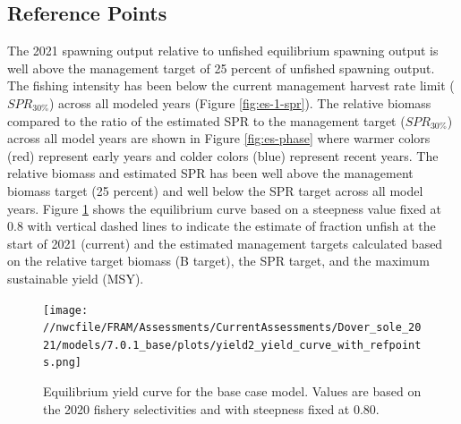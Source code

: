\documentclass[11pt,
  english,
  a4paper,
]{article}
\begin{document}
\hypertarget{reference-points}{%
\subsection*{Reference Points}\label{reference-points}}

\leavevmode\tagmcend\tagstructend


The 2021 spawning output relative to unfished equilibrium spawning output is well above the management target of 25 percent of unfished spawning output. The fishing intensity has been below the current management harvest rate limit ({\(SPR_{30\%}\)\leavevmode\tagmcend\tagstructend}) across all modeled years (Figure \ref{fig:es-1-spr}). The relative biomass compared to the ratio of the estimated SPR to the management target ({\(SPR_{30\%}\)\leavevmode\tagmcend\tagstructend}) across all model years are shown in Figure \ref{fig:es-phase} where warmer colors (red) represent early years and colder colors (blue) represent recent years. The relative biomass and estimated SPR has been well above the management biomass target (25 percent) and well below the SPR target across all model years. Figure \ref{fig:es-yield} shows the equilibrium curve based on a steepness value fixed at 0.8 with vertical dashed lines to indicate the estimate of fraction unfish at the start of 2021 (current) and the estimated management targets calculated based on the relative target biomass (B target), the SPR target, and the maximum sustainable yield (MSY).

\leavevmode\tagmcend\tagstructend\par


\begin{figure}
\centering
\texttt{[image: //nwcfile/FRAM/Assessments/CurrentAssessments/Dover\_sole\_2021/models/7.0.1\_base/plots/yield2\_yield\_curve\_with\_refpoints.png]}
\caption{Equilibrium yield curve for the base case model. Values are based on the 2020 fishery selectivities and with steepness fixed at 0.80.\label{fig:es-yield}}
\end{figure}
\end{document}
